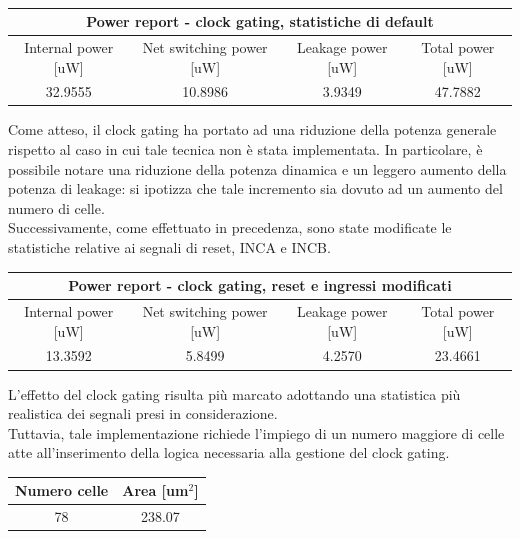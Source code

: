 \documentclass[11pt,  english, makeidx, a4paper, titlepage, oneside]{book}
\begin{document}
\\
\begin{center}
	\begin{tabular}{|c|c|c|c|}
	\hline
	\multicolumn{4}{c}{Power report - clock gating, statistiche di default}\\
	\hline
	Internal power [uW] & Net switching power [uW] & Leakage power [uW] & Total power [uW] \\
	\hline
	 32.9555 & 10.8986  & 3.9349  &  47.7882 \\
	\hline
	\end{tabular}	
\end{center}
\vspace{0.3cm}         
Come atteso, il clock gating ha portato ad una riduzione della potenza generale rispetto al caso in cui tale tecnica non è stata implementata. In particolare, è possibile notare una riduzione della potenza dinamica e un leggero aumento della potenza di leakage: si ipotizza che tale incremento sia dovuto ad un aumento del numero di celle.
\\
Successivamente, come effettuato in precedenza, sono state modificate le statistiche relative ai segnali di reset, INCA e INCB.
\begin{center}
	\begin{tabular}{|c|c|c|c|}
	\hline
	\multicolumn{4}{c}{Power report - clock gating, reset e ingressi modificati}\\
	\hline
	Internal power [uW] & Net switching power [uW] & Leakage power [uW] & Total power [uW] \\
	\hline
	 13.3592 & 5.8499  & 4.2570  &  23.4661 \\
	\hline
	\end{tabular}	
\end{center}
\vspace{0.3cm}        
L'effetto del clock gating risulta più marcato adottando una statistica più realistica dei segnali presi in considerazione.
\\
Tuttavia, tale implementazione richiede l'impiego di un numero maggiore di celle atte all'inserimento della logica necessaria alla gestione del clock gating.     
\\
\begin{center}
	\begin{tabular}{|c|c|}
	\hline
	Numero celle & Area [um$^2$] \\
	\hline
	 78 & 238.07 \\
	\hline
	\end{tabular}	
\end{center}
\end{document}
